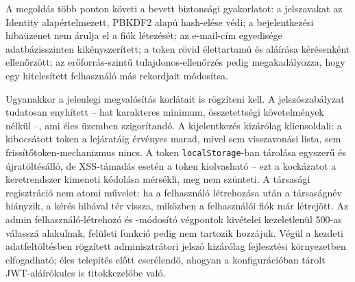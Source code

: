 A megoldás több ponton követi a bevett biztonsági gyakorlatot: a jelszavakat az Identity
alapértelmezett, PBKDF2 alapú hash-elése védi; a bejelentkezési hibaüzenet nem árulja el a fiók
létezését; az e-mail-cím egyedisége adatbázisszinten kikényszerített; a token rövid élettartamú és
aláírása kérésenként ellenőrzött; az erőforrás-szintű tulajdonos-ellenőrzés pedig megakadályozza,
hogy egy hitelesített felhasználó más rekordjait módosítsa.

Ugyanakkor a jelenlegi megvalósítás korlátait is rögzíteni kell. A jelszószabályzat tudatosan
enyhített -- hat karakteres minimum, összetettségi követelmények nélkül --, ami éles üzemben
szigorítandó. A kijelentkezés kizárólag kliensoldali: a kibocsátott token a lejáratáig érvényes
marad, mivel sem visszavonási lista, sem frissítőtoken-mechanizmus nincs. A token
\texttt{localStorage}-ban tárolása egyszerű és újratöltésálló, de XSS-támadás esetén a token
kiolvasható -- ezt a kockázatot a keretrendszer kimeneti kódolása mérsékli, meg nem szünteti. A
társasági regisztráció nem atomi művelet: ha a felhasználó létrehozása után a társaságnév
hiányzik, a kérés hibával tér vissza, miközben a felhasználói fiók már létrejött. Az admin
felhasználó-létrehozó és -módosító végpontok kivételei kezeletlenül 500-as válasszá alakulnak,
felületi funkció pedig nem tartozik hozzájuk. Végül a kezdeti adatfeltöltésben rögzített
adminisztrátori jelszó kizárólag fejlesztési környezetben elfogadható; éles telepítés előtt
cserélendő, ahogyan a konfigurációban tárolt JWT-aláírókulcs is titokkezelőbe való.
